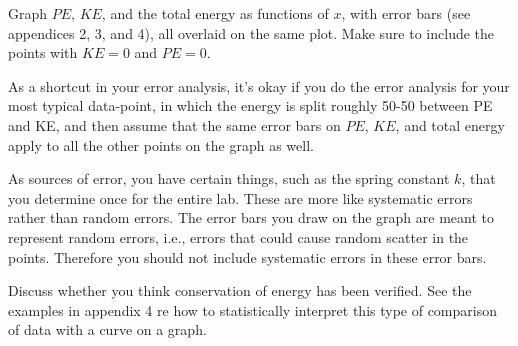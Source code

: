\analysis

Graph $PE$, $KE$, and the total energy as functions of $x$,
with error bars (see appendices 2, 3, and 4), all overlaid
on the same plot. Make sure to include the points with $KE=0$ and
$PE=0$.

As a shortcut in your error analysis, it's okay if you
do the error analysis for your most typical data-point, in which
the energy is split roughly 50-50 between PE and KE, and then assume
that the same error bars on $PE$, $KE$, and total energy apply to
all the other points on the graph as well.

As sources of error, you have certain things, such as the spring constant $k$,
that you determine once for the entire lab. These are more like systematic
errors rather than random errors. The error bars you draw on the graph are
meant to represent random errors, i.e., errors that could cause random scatter
in the points. Therefore you should not include systematic errors in these
error bars.

Discuss whether you think conservation of
energy has been verified. See the examples in appendix 4 re how to statistically interpret
this type of comparison of data with a curve on a graph.
